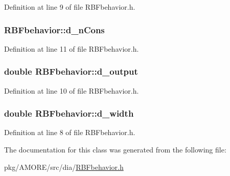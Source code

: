 Definition at line 9 of file RBFbehavior.h.

\hypertarget{class_r_b_fbehavior_aee0030c63fc36e3cb5ffac67dbaa77d5}{
\subsubsection[{d\_\-nCons}]{ {\bf RBFbehavior::d\_\-nCons}}}
\label{class_r_b_fbehavior_aee0030c63fc36e3cb5ffac67dbaa77d5}


Definition at line 11 of file RBFbehavior.h.

\hypertarget{class_r_b_fbehavior_a73826fb24b1ef473ea546babbb4bdbd2}{
\subsubsection[{d\_\-output}]{\setlength{\rightskip}{0pt plus 5cm}double {\bf RBFbehavior::d\_\-output}}}
\label{class_r_b_fbehavior_a73826fb24b1ef473ea546babbb4bdbd2}


Definition at line 10 of file RBFbehavior.h.

\hypertarget{class_r_b_fbehavior_a6b37a2973f5e8390e37333e81de26077}{
\subsubsection[{d\_\-width}]{\setlength{\rightskip}{0pt plus 5cm}double {\bf RBFbehavior::d\_\-width}}}
\label{class_r_b_fbehavior_a6b37a2973f5e8390e37333e81de26077}


Definition at line 8 of file RBFbehavior.h.



The documentation for this class was generated from the following file:\begin{DoxyCompactItemize}
\item 
pkg/AMORE/src/dia/\hyperlink{_r_b_fbehavior_8h}{RBFbehavior.h}\end{DoxyCompactItemize}
